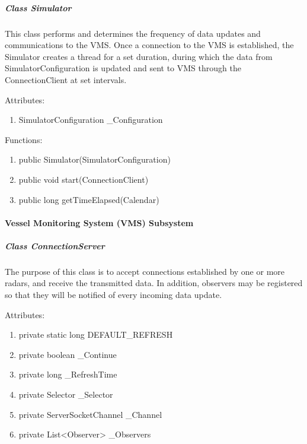 \documentclass{article}
\begin{document}
\subparagraph{Class Simulator}
This class performs and determines the frequency of data updates and communications to the VMS. Once a connection to the VMS is established, the Simulator creates a thread for a set duration, during which the data from SimulatorConfiguration is updated and sent to VMS through the ConnectionClient at set intervals.

Attributes:
\begin{enumerate}
	\item SimulatorConfiguration _Configuration
\end {enumerate}

Functions:
\begin{enumerate}
	\item public Simulator(SimulatorConfiguration)
	\item public void start(ConnectionClient)
	\item public long getTimeElapsed(Calendar)
\end{enumerate}

\paragraph{Vessel Monitoring System (VMS) Subsystem}

\subparagraph{Class ConnectionServer}
The purpose of this class is to accept connections established by one or more radars, and receive the transmitted data. In addition, observers may be registered so that they will be notified of every incoming data update.

Attributes:
\begin{enumerate}
	\item private static long DEFAULT_REFRESH
    \item private boolean _Continue
    \item private long _RefreshTime
    \item private Selector _Selector
    \item private ServerSocketChannel _Channel
    \item private List<Observer> _Observers
\end {enumerate}
\end{document}
